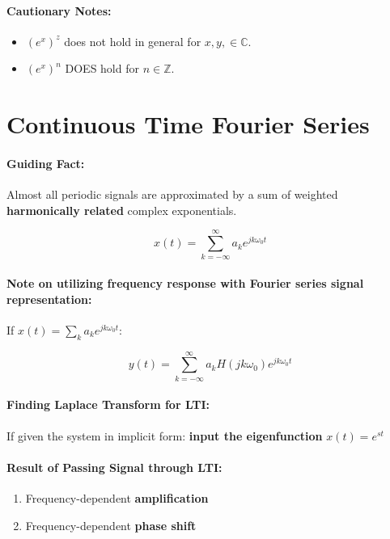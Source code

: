 \documentclass[a4paper,12pt]{report}
\begin{document}
\paragraph{Cautionary Notes: } 
\begin{itemize}
\item $(e^x)^z$ does not hold in general for $x, y, \in \mathbb{C}$.
\item $(e^x)^n$ DOES hold for $n\in \mathbb{Z}$.
\end{itemize}

\section{Continuous Time Fourier Series}

\paragraph{Guiding Fact: } Almost all periodic signals are approximated by a sum of weighted \textbf{harmonically related} complex exponentials.

\begin{equation}
x(t) = \sum_{k=-\infty}^{\infty} a_k e^{jk\omega_0 t}
\end{equation}

\paragraph{Note on utilizing frequency response with Fourier series signal representation: } If $x(t) = \sum_{k}^{} a_k e^{jk\omega_0 t}$: 

\begin{equation}
y(t) = \sum_{k=-\infty}^{\infty} a_k H(jk\omega_0) e^{jk\omega_0 t}
\end{equation}

\paragraph{Finding Laplace Transform for LTI: } If given the system in implicit form: \textbf{input the eigenfunction} $x(t) = e^{st}$

\paragraph{Result of Passing Signal through LTI: } 
\begin{enumerate}
\item Frequency-dependent \textbf{amplification} 
\item Frequency-dependent \textbf{phase shift} 
\end{enumerate}
\end{document}
